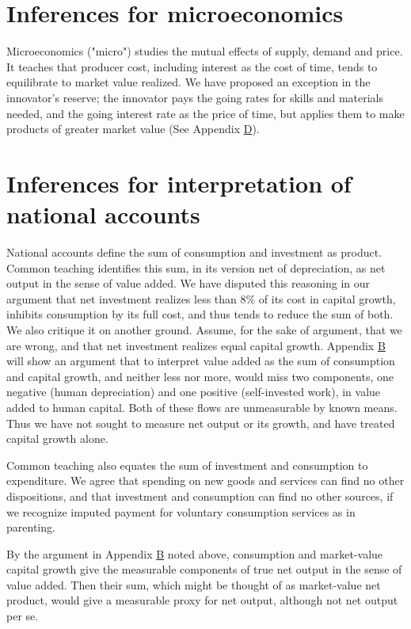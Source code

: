 \documentclass[a4padisinvitingper,fleqn]{latex_styles/cas-sc}
\begin{document}
\section{Inferences for microeconomics}

Microeconomics ("micro") studies the mutual effects of supply, demand and price. It teaches that producer cost, including interest as the cost of time, tends to equilibrate to market value realized. We have proposed an exception in the innovator's reserve; the innovator pays the going rates for skills and materials needed, and the going interest rate as the price of time, but applies them to make products of greater market value (See Appendix \hyperref[appendix-d]{D}).


\hypertarget{net-output}{
\section{Inferences for interpretation of national accounts}\label{net-output}
}
National accounts define the sum of consumption and investment as product. Common teaching identifies this sum, in its version net of depreciation, as net output in the sense of value added.
We have disputed this reasoning in our argument that net investment realizes less than 8\% of its cost in capital growth, inhibits consumption by its full cost, and thus tends to reduce the sum of both. We also critique it on another ground. Assume, for the sake of argument, that we are wrong, and that net investment realizes equal capital growth.
Appendix \hyperref[appendix-b]{B} will show an argument that to interpret value added as the sum of consumption and capital growth, and neither less nor more, would miss two components, one negative (human depreciation) and one positive (self-invested work), in value added to human capital. Both of these flows are unmeasurable by known means. Thus we have not sought to measure net output or its growth, and have treated capital growth alone.

Common teaching also equates the sum of investment and consumption to expenditure. We agree that spending on new goods and services can find no other dispositions, and that investment and consumption can find no other sources, if we recognize imputed payment for voluntary consumption services as in parenting.

By the argument in Appendix \hyperref[appendix-b]{B} noted above, consumption and market-value capital growth give the measurable components of true net output in the sense of value added. Then their sum, which might be thought of as market-value net product, would give a measurable proxy for net output, although not net output per se.
\end{document}
